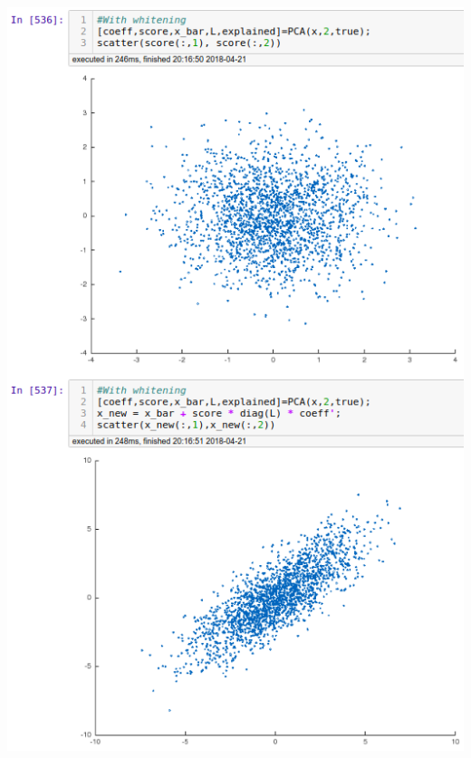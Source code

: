 \documentclass[12pt,letterpaper,fleqn]{hmcpset}
\begin{document}
\begin{solution}
\includegraphics[width=1\textwidth]{3.jpg}\\

\end{solution}
\end{document}
